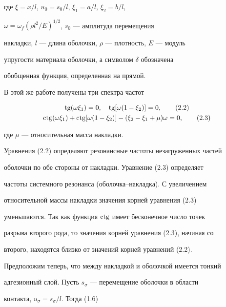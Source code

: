 где $\xi=x/l$, $u_{0}=s_{0}/l$, $\xi_{1}=a/l$, $\xi_{2}=b/l$,


$\omega=\omega_{f}(\rho l^{2}/E)^{1/2}$, $s_{0}$ --- амплитуда перемещения


накладки, $l$ --- длина оболочки, $\rho$ --- плотность, $E$ --- модуль


упругости материала оболочки, а символом $\delta$ обозначена


обобщенная функция, определенная на прямой.





В этой же работе получены три спектра частот


\begin{gather}


\tg(\omega\xi_{1})=0, \quad \tg[\omega(1-\xi_{2})]=0,


\tag{2.2} \\


\ctg(\omega\xi_{1})+\ctg[\omega(1-\xi_{2})]-


(\xi_{2}-\xi_{1}+\mu)\omega=0,


\tag{2.3}


\end{gather}


где $\mu$ --- относительная масса накладки.





Уравнения (2.2) определяют резонансные частоты незагруженных частей


оболочки по обе стороны от накладки. Уравнение (2.3) определяет


частоты системного резонанса (оболочка--накладка). С увеличением


относительной массы накладки значения корней уравнения (2.3)


уменьшаются. Так как функция $\operatorname{ctg}$ имеет бесконечное число точек


разрыва второго рода, то значения корней уравнения (2.3), начиная со


второго, находятся близко от значений корней уравнений (2.2).





Предположим теперь, что между накладкой и оболочкой имеется тонкий


адгезионный слой. Пусть $s_{\sigma}$ --- перемещение оболочки в области


контакта, $ u_{\sigma}=s_{\sigma}/l$. Тогда (1.6)


